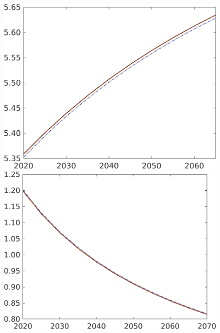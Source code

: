 \begin{figure}[h!!]
\begin{minipage}[]{0.32\textwidth}
	\end{minipage}
	\begin{minipage}[]{0.32\textwidth}
		\includegraphics[width=1\textwidth]{../../codding_model/own_basedOnFried/optimalPol_190722_tidiedUp/figures/all_10Aout22/CountNskTaulLF_target_gAagg_spillover0_sep1_extern0_PV1_etaa0.79_lgd0.png}
	\end{minipage}
\begin{minipage}[]{0.32\textwidth}
\includegraphics[width=1\textwidth]{../../codding_model/own_basedOnFried/optimalPol_190722_tidiedUp/figures/all_10Aout22/CountNskTaulLF_target_sgsff_spillover0_sep1_extern0_PV1_etaa0.79_lgd0.png}
\end{minipage}
\end{figure}

